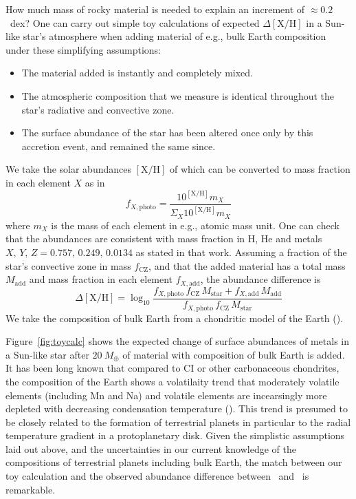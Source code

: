 \documentclass[manuscript]{aastex6}
\newcommand*\elem[1]{\ensuremath{\mathrm{#1}}}
\newcommand*\elemH[1]{\ensuremath{[\mathrm{#1}/\elem{H}]}}
\newcommand{\sunanalog}{\text{Krios}}
\newcommand{\bizarreone}{\text{Kronos}}
\newcommand{\mearth}{\ensuremath{M_\oplus}}
\begin{document}
How much mass of rocky material is needed to explain an increment of $\approx 0.2$~dex?
One can carry out simple toy calculations of expected $\Delta\elemH{X}$
in a Sun-like star's atmosphere when adding material of e.g., bulk Earth composition
under these simplifying assumptions:
\begin{itemize}
  \item The material added is instantly and completely mixed.
  \item The atmospheric composition that we measure is identical throughout
    the star's radiative and convective zone.
  \item The surface abundance of the star has been altered once only by this
    accretion event, and remained the same since.
\end{itemize}

We take the solar abundances $\elemH{X}$ of \citealt{Asplund:2009aa}
which can be converted to mass fraction in each element $X$ as in
\begin{equation}
  f_{X,\mathrm{photo}} = \frac{10^{\elemH{X}} m_X}{\Sigma_X 10^{\elemH{X}} m_X}
\end{equation}
where $m_X$ is the mass of each element in e.g., atomic mass unit.
One can check that the \citealt{Asplund:2009aa} abundances
are consistent with mass fraction in \elem{H}, \elem{He} and metals
$X,\,Y,\,Z=0.757,\,0.249,\,0.0134$ as stated in that work.
Assuming a fraction of the star's convective zone in mass $f_\mathrm{CZ}$,
and that the added material has a total mass $M_\mathrm{add}$ and mass fraction in each
element $f_{X,\mathrm{add}}$,
the abundance difference is
\begin{equation}
  \Delta\elemH{X} = \log_{10} \frac{f_{X,\mathrm{photo}}\,f_\mathrm{CZ}\,M_\mathrm{star} + f_{X,\mathrm{add}}\,M_\mathrm{add}}
    {f_{X,\mathrm{photo}}\,f_\mathrm{CZ}\,M_\mathrm{star}}
\end{equation}
We take the composition of bulk Earth from a chondritic model of the Earth
(\citealt{mcdonough2001composition}).

Figure~\ref{fig:toycalc} shows the expected change of surface abundances of
metals in a Sun-like star after $20~\mearth$ of material with composition of
bulk Earth is added.
It has been long known that compared to CI or other carbonaceous chondrites,
the composition of the Earth shows a volatilaity trend that moderately volatile
elements (including Mn and Na) and volatile elements are incearsingly more
depleted with decreasing condensation temperature
(\citealt{mcdonough2001composition}).
This trend is presumed to be closely related to the formation of terrestrial
planets in particular to the radial temperature gradient in a protoplanetary
disk.
Given the simplistic assumptions laid out above, and the uncertainties in our
current knowledge of the compositions of terrestrial planets including bulk
Earth, the match between our toy calculation and the observed abundance
difference between \bizarreone\ and \sunanalog\ is remarkable.
\end{document}

